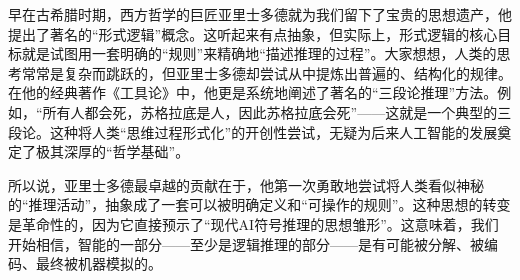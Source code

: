 

早在古希腊时期，西方哲学的巨匠亚里士多德就为我们留下了宝贵的思想遗产，他提出了著名的“形式逻辑”概念。这听起来有点抽象，但实际上，形式逻辑的核心目标就是试图用一套明确的“规则”来精确地“描述推理的过程”。大家想想，人类的思考常常是复杂而跳跃的，但亚里士多德却尝试从中提炼出普遍的、结构化的规律。在他的经典著作《工具论》中，他更是系统地阐述了著名的“三段论推理”方法。例如，“所有人都会死，苏格拉底是人，因此苏格拉底会死”——这就是一个典型的三段论。这种将人类“思维过程形式化”的开创性尝试，无疑为后来人工智能的发展奠定了极其深厚的“哲学基础”。

所以说，亚里士多德最卓越的贡献在于，他第一次勇敢地尝试将人类看似神秘的“推理活动”，抽象成了一套可以被明确定义和“可操作的规则”。这种思想的转变是革命性的，因为它直接预示了“现代AI符号推理的思想雏形”。这意味着，我们开始相信，智能的一部分——至少是逻辑推理的部分——是有可能被分解、被编码、最终被机器模拟的。
